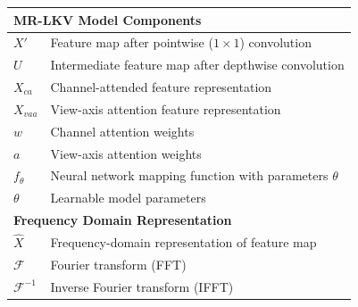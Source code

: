 \begin{longtable}{ll}
\multicolumn{2}{l}{\textbf{MR-LKV Model Components}} \\
\hline
$X'$ & Feature map after pointwise ($1 \times 1$) convolution \\
$U$ & Intermediate feature map after depthwise convolution \\
$X_{ca}$ & Channel-attended feature representation \\
$X_{vaa}$ & View-axis attention feature representation \\
$w$ & Channel attention weights \\
$a$ & View-axis attention weights \\
$f_\theta$ & Neural network mapping function with parameters $\theta$ \\
$\theta$ & Learnable model parameters \\

\multicolumn{2}{l}{\textbf{Frequency Domain Representation}} \\
\hline
$\hat{X}$ & Frequency-domain representation of feature map \\
$\mathcal{F}$ & Fourier transform (FFT) \\
$\mathcal{F}^{-1}$ & Inverse Fourier transform (IFFT) \\


\end{longtable}